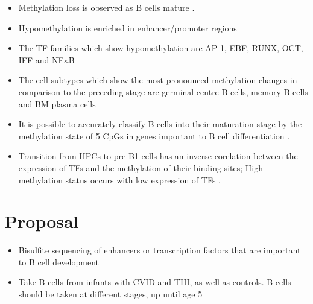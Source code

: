 \documentclass[12pt]{article}
\begin{document}
	\begin{itemize}
		\item Methylation loss is observed as B cells mature \citep{Oakes16}.
		\item Hypomethylation is enriched in enhancer/promoter regions
		\item The TF families which show hypomethylation are AP-1, EBF, RUNX, OCT, IFF and NF$\kappa$B
		\item The cell subtypes which show the most pronounced methylation changes in comparison to the preceding stage are germinal centre B cells, memory B cells and BM plasma cells \citep{Kulis15}
		\item It is possible to accurately classify B cells into their maturation stage by the methylation state of 5 CpGs in genes important to B cell differentiation \citep{Kulis15}.
		\item Transition from HPCs to pre-B1 cells has an inverse corelation between the expression of TFs and the methylation of their binding sites; High methylation status occurs with low expression of TFs \citep{Kulis15}. 
	\end{itemize}
	
	
	\section{Proposal}
	
	
	
	\begin{itemize}
		\item Bisulfite sequencing of enhancers or transcription factors that are important to B cell development
		\item Take B cells from infants with CVID and THI, as well as controls. B cells should be taken at different stages, up until age 5
	\end{itemize}
	
	\newpage
	
	
	
\end{document}
